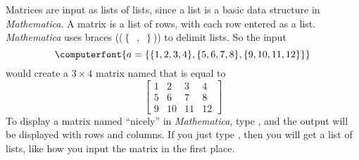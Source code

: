 Matrices are input as lists of lists, since a list is a basic data structure in {\sl Mathematica}.  A matrix is a list of rows, with each row entered as a list.  {\sl Mathematica} uses braces (($\left\lbrace\right.$~,~$\left.\right\rbrace$)) to delimit lists.  So the input
\begin{equation*}
\computerfont{a = \{\{1,2,3,4\}, \{5,6,7,8\},\{9,10,11,12\}\}}
\end{equation*}
%
would create a $3\times 4$ matrix named  that is equal to
%
\begin{equation*}
%
\begin{bmatrix}
1&2&3&4\\
5&6&7&8\\
9&10&11&12
\end{bmatrix}
%
\end{equation*}
%
To display a matrix named  ``nicely'' in {\sl Mathematica}, type , and the output will be displayed with rows and columns.  If you just type , then you will get a list of lists, like how you input the matrix in the first place.